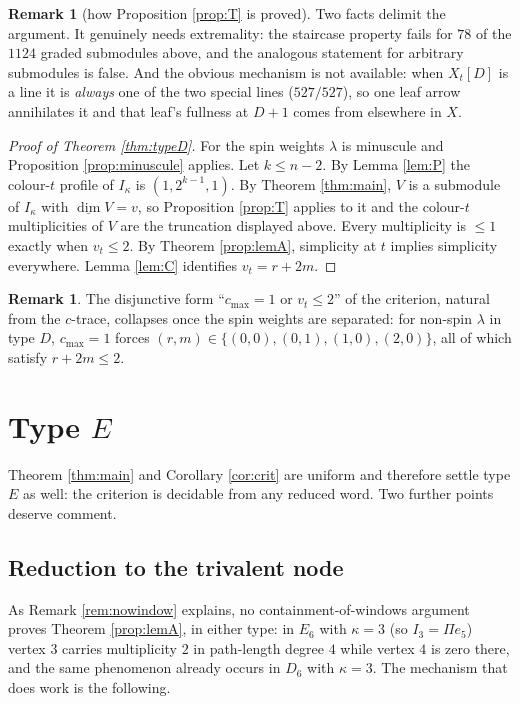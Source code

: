 \documentclass[11pt,reqno]{amsart}
\theoremstyle{plain}
\theoremstyle{definition}
\newtheorem{remark}[theorem]{Remark}
\newcommand{\Pia}{\Pi}
\newcommand{\dimv}{\underline{\dim}}
\newcommand{\la}{\lambda}
\newcommand{\ka}{\kappa}
\begin{document}
\begin{remark}[how Proposition \ref{prop:T} is proved]
Two facts delimit the argument.  It genuinely needs extremality: the
staircase property fails for $78$ of the $1124$ graded submodules above, and
the analogous statement for arbitrary submodules is false.  And the obvious
mechanism is not available: when $X_t[D]$ is a line it is \emph{always} one of
the two special lines ($527/527$), so one leaf arrow annihilates it and that
leaf's fullness at $D+1$ comes from elsewhere in $X$.
\end{remark}

\begin{proof}[Proof of Theorem \ref{thm:typeD}]
For the spin weights $\la$ is minuscule and Proposition \ref{prop:minuscule}
applies.  Let $k\le n-2$.  By Lemma \ref{lem:P} the colour-$t$ profile of
$I_\ka$ is $(1,2^{k-1},1)$.  By Theorem \ref{thm:main}, $V$ is a submodule of
$I_\ka$ with $\dimv V=v$, so Proposition \ref{prop:T} applies to it and the
colour-$t$ multiplicities of $V$ are the truncation displayed above.  Every
multiplicity is $\le1$ exactly when $v_t\le2$.  By Theorem \ref{prop:lemA},
simplicity at $t$ implies simplicity everywhere.  Lemma
\ref{lem:C} identifies $v_t=r+2m$.
\end{proof}

\begin{remark}
The disjunctive form ``$c_{\max}=1$ or $v_t\le2$'' of the criterion, natural
from the $c$-trace, collapses once the spin weights are separated: for
non-spin $\la$ in type $D$, $c_{\max}=1$ forces
$(r,m)\in\{(0,0),(0,1),(1,0),(2,0)\}$, all of which satisfy $r+2m\le2$.
\end{remark}

\section{Type \texorpdfstring{$E$}{E}}\label{sec:typeE}

Theorem \ref{thm:main} and Corollary \ref{cor:crit} are uniform and therefore
settle type $E$ as well: the criterion is decidable from any reduced word.
Two further points deserve comment.

\subsection{Reduction to the trivalent node}
As Remark \ref{rem:nowindow} explains, no containment-of-windows argument
proves Theorem \ref{prop:lemA}, in either type: in $E_6$ with $\ka=3$ (so
$I_3=\Pia e_5$) vertex $3$ carries multiplicity $2$ in path-length degree $4$
while vertex $4$ is zero there, and the same phenomenon already occurs in
$D_6$ with $\ka=3$.  The mechanism that does work is the following.
\end{document}
